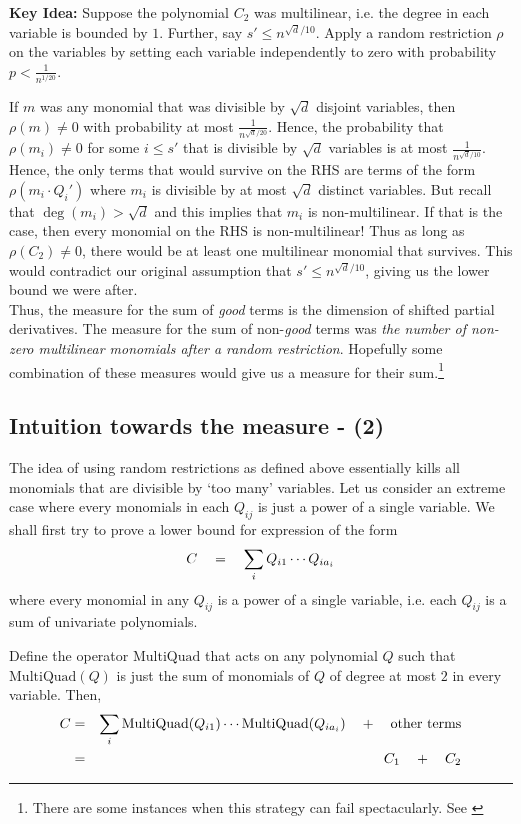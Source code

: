 {\bf Key Idea:} Suppose the polynomial $C_2$ was multilinear, i.e. the degree in each variable is bounded by $1$. 
Further, say $s' \leq n^{\sqrt{d}/10}$. 
Apply a random restriction $\rho$ on the variables by setting each variable independently to zero with probability $p < \frac{1}{n^{1/20}}$. 

If $m$ was any monomial that was divisible by $\sqrt{d}$ disjoint variables, then $\rho(m) \neq 0$ with probability at most $\frac{1}{n^{\sqrt{d}/20}}$. 
Hence, the probability that $\rho(m_i) \neq 0$ for some $i\leq s'$ that is divisible  by $\sqrt{d}$ variables is at most $\frac{1}{n^{\sqrt{d}/10}}$. 
Hence, the only terms that would survive on the RHS are terms of the form $\rho(m_i \cdot Q_i')$ where $m_i$ is divisible by at most $\sqrt{d}$ distinct variables. 
But recall that $\deg(m_i) > \sqrt{d}$ and this implies that $m_i$ is non-multilinear. 
If that is the case, then every monomial on the RHS is non-multilinear! 
Thus as long as $\rho(C_2) \neq 0$, there would be at least one multilinear monomial that survives. 
This would contradict our original assumption that $s' \leq n^{\sqrt{d}/10}$, giving us the lower bound we were after. \\

Thus, the measure for the sum of \emph{good} terms is the dimension of shifted partial derivatives. 
The measure for the sum of non-\emph{good} terms was \emph{the number of non-zero multilinear monomials after a random restriction}. 
Hopefully some combination of these measures would give us a measure for their sum.\footnote{There are some instances when this strategy can fail spectacularly. 
See \cite{KS14a}}

\subsection*{Intuition towards the measure - (2)}

The idea of using random restrictions as defined above essentially kills all monomials that are divisible by `too many' variables. 
Let us consider an extreme case where every monomials in each $Q_{ij}$ is just a power of a single variable. 
We shall first try to prove a lower bound for expression of the form
\[
C\quad = \quad \sum_{i}Q_{i1}\cdots Q_{ia_i}
\]
where every monomial in any $Q_{ij}$ is a power of a single variable, i.e. each $Q_{ij}$ is a sum of univariate polynomials. 

Define the operator $\mathrm{MultiQuad}$ that acts on any polynomial $Q$ such that $\mathrm{MultiQuad}(Q)$ is just the sum of monomials of $Q$ of degree at most $2$ in every variable. 
Then,
\begin{eqnarray*}
C &=&  \sum_{i}\mathrm{MultiQuad}(Q_{i1})\cdots \mathrm{MultiQuad}(Q_{ia_i}) \quad + \quad \text{other terms}\\
  & = & \qquad C_1 \quad + \quad C_2
\end{eqnarray*}

